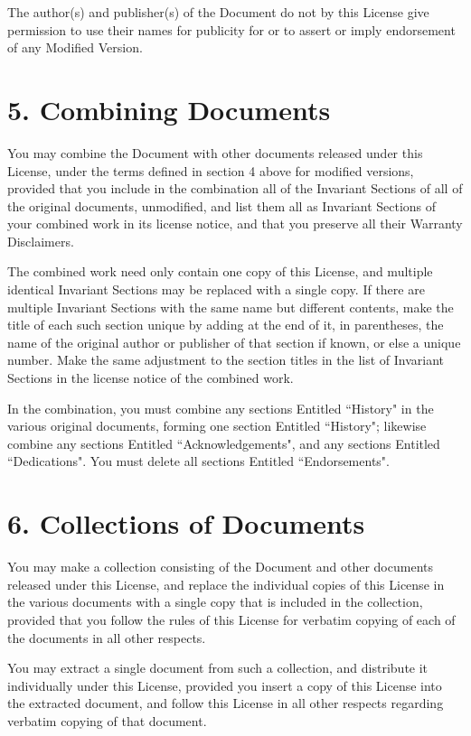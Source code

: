 \documentclass[12pt]{book}
\numberwithin{exc}{section}
\numberwithin{figure}{section}
\numberwithin{equation}{theorem}
\begin{document}
The author(s) and publisher(s) of the Document do not by this License
give permission to use their names for publicity for or to assert or
imply endorsement of any Modified Version.

\section{5. Combining Documents}


You may combine the Document with other documents released under this
License, under the terms defined in section 4 above for modified
versions, provided that you include in the combination all of the
Invariant Sections of all of the original documents, unmodified, and
list them all as Invariant Sections of your combined work in its
license notice, and that you preserve all their Warranty Disclaimers.

The combined work need only contain one copy of this License, and
multiple identical Invariant Sections may be replaced with a single
copy.  If there are multiple Invariant Sections with the same name but
different contents, make the title of each such section unique by
adding at the end of it, in parentheses, the name of the original
author or publisher of that section if known, or else a unique number.
Make the same adjustment to the section titles in the list of
Invariant Sections in the license notice of the combined work.

In the combination, you must combine any sections Entitled ``History"
in the various original documents, forming one section Entitled
``History"; likewise combine any sections Entitled ``Acknowledgements",
and any sections Entitled ``Dedications".  You must delete all sections
Entitled ``Endorsements".

\section{6. Collections of Documents}

You may make a collection consisting of the Document and other documents
released under this License, and replace the individual copies of this
License in the various documents with a single copy that is included in
the collection, provided that you follow the rules of this License for
verbatim copying of each of the documents in all other respects.

You may extract a single document from such a collection, and distribute
it individually under this License, provided you insert a copy of this
License into the extracted document, and follow this License in all
other respects regarding verbatim copying of that document.
\end{document}
